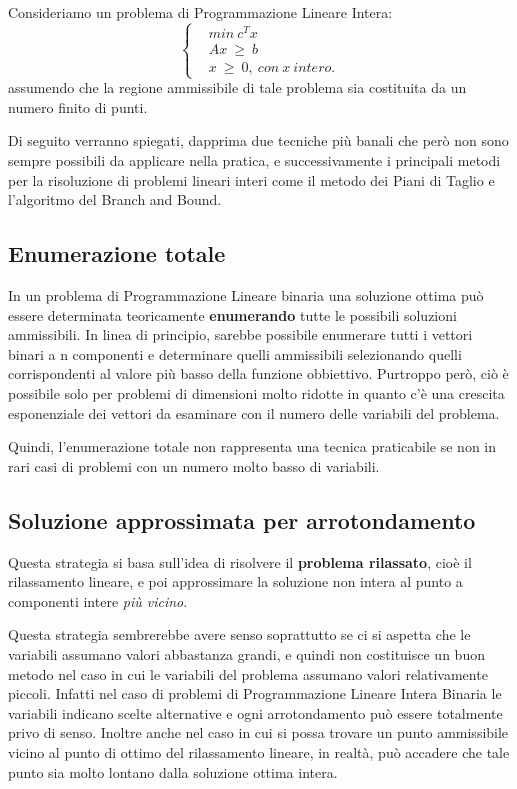 Consideriamo un problema di Programmazione Lineare Intera:
\begin{equation}
\label{eq:progLinInt}
\begin{cases}
& min ~ c^T x \\
& Ax ~ \geq ~ b \\
& x ~ \geq ~ 0, ~ con ~ x ~ intero.
\end{cases}
\end{equation}
assumendo che la regione ammissibile di tale problema sia costituita da un numero finito di punti.

Di seguito verranno spiegati, dapprima due tecniche più banali che però non sono sempre possibili da applicare nella pratica, e successivamente i principali metodi per la risoluzione di problemi lineari interi come il metodo dei Piani di Taglio e l'algoritmo del Branch and Bound.

\subsection{Enumerazione totale}
In un problema di Programmazione Lineare binaria una soluzione ottima può essere determinata teoricamente \textbf{enumerando} tutte le possibili soluzioni ammissibili. In linea di principio, sarebbe possibile enumerare tutti i vettori binari a n componenti e determinare quelli ammissibili selezionando quelli corrispondenti al valore più basso della funzione obbiettivo.
Purtroppo però, ciò è possibile solo per problemi di dimensioni molto ridotte in quanto c'è una crescita esponenziale dei vettori da esaminare con il numero delle variabili del problema.

Quindi, l'enumerazione totale non rappresenta una tecnica praticabile se non in rari casi di problemi con un numero molto basso di variabili.

\subsection{Soluzione approssimata per arrotondamento}
Questa strategia si basa sull'idea di risolvere il \textbf{problema rilassato}, cioè il rilassamento lineare, e poi approssimare la soluzione non intera al punto a componenti intere \textit{più vicino}.

Questa strategia sembrerebbe avere senso soprattutto se ci si aspetta che le variabili assumano valori abbastanza grandi, e quindi non costituisce un buon metodo nel caso in cui le variabili del problema assumano valori relativamente piccoli. Infatti nel caso di problemi di Programmazione Lineare Intera Binaria le variabili indicano scelte alternative e ogni arrotondamento può essere totalmente privo di senso. Inoltre anche nel caso in cui si possa trovare un punto ammissibile vicino al punto di ottimo del rilassamento lineare, in realtà, può accadere che tale punto sia molto lontano dalla soluzione ottima intera.

